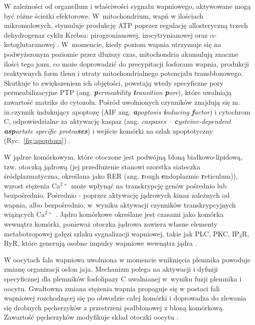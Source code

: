 W zależności od organellum i właściwości sygnału wapniowego, aktywowane mogą być różne ścieżki efektorowe. W~mitochondrium, wapń w ilościach mikromolowych, stymuluje produkcję ATP poprzez regulację allosteryczną trzech dehydrogenaz cyklu Krebsa: pirogronianowej, izocytrynianowej oraz $\alpha$-ketoglutaranowej \cite{Denton2009,Griffiths2009}. W~momencie, kiedy poziom wapnia utrzymuje się na podwyższonym poziomie przez dłuższy czas, mitochondria akumulują znaczne ilości tego jonu, co może doprowadzić do precypitacji fosforanu wapnia, produkcji reaktywnych form tlenu i utraty mitochondrialnego potencjału transbłonowego. Skutkuje to zwiększeniem ich objętości, powstają wtedy specyficzne pory permeabilizacyjne PTP (ang. \textit{\textbf{p}ermeability \textbf{t}ransition \textbf{p}ore}), które uwalniają zawartość matriks do cytozolu. Pośród uwolnionych czynników znajdują się m. in.czynnik indukujący apoptozę (AIF ang. \textit{\textbf{a}poptosis \textbf{i}nducing \textbf{f}actor}) i cytochrom C, odpowiedzialne za aktywację kaspaz (ang. \textit{caspases -- \textbf{c}ysteine-dependent \textbf{asp}artate specific protea\textbf{ses}}) i wejście komórki na szlak apoptotyczny (Ryc.~\ref{fig:apoptoza}) \cite{Demaurex2003,Desagher2000}.

W jądrze komórkowym, które otoczone jest podwójną błoną białkowo-lipidową, tzw. otoczką jądrową (jej przedłużenie stanowi szorstka siateczka śródplazmatyczna, określana jako RER (ang. \textbf{r}ough \textbf{e}ndoplazmic \textbf{r}eticulum)), wzrost stężenia Ca$^{2+}$ może wpłynąć na transkrypcję genów pośrednio lub bezpośrednio. Pośrednio - poprzez aktywację jądrowych kinaz zależnych od wapnia, albo bezpośrednio, w~wyniku aktywacji czynników transkrypcyjnych wiążących Ca$^{2+}$ \cite{Gomes2006}. Jądro komórkowe określane jest czasami jako komórka wewnątrz komórki, ponieważ otoczka jądrowa zawiera własne elementy metabotropowej gałęzi szlaku sygnalizacji wapniowej, takie jak PLC, PKC, IP$_3$R, RyR, które generują osobne impulsy wapniowe wewnątrz jądra \cite{Rodrigues2009}.


W oocytach fala wapniowa uwolniona w momencie wniknięcia plemnika powoduje zmianę organizacji osłon jaja. Mechanizm polega na aktywacji i dyfuzji specyficznej dla plemników fosfolipazy C uwalnianej w~wyniku fuzji plemnika i oocytu. Gwałtowna zmiana stężenia wapnia propaguje się w postaci fali wapniowej rozchodzącej się po obwodzie całej komórki i doprowadza do zlewania się drobnych pęcherzyków z przestrzeni podbłonowej z błoną komórkową. Zawartość pęcherzyków modyfikuje skład otoczki oocytu \cite{Whitaker2006}.

